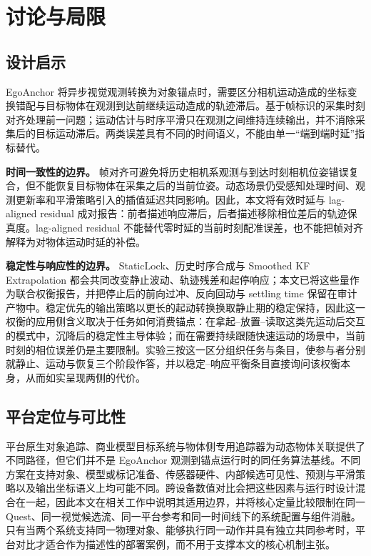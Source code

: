 \documentclass[review]{vgtc}
\begin{document}
\section{讨论与局限}\label{sec:discussion}


\subsection{设计启示}


EgoAnchor 将异步视觉观测转换为对象锚点时，需要区分相机运动造成的坐标变换错配与目标物体在观测到达前继续运动造成的轨迹滞后。基于帧标识的采集时刻对齐处理前一问题；运动估计与时序平滑只在观测之间维持连续输出，并不消除采集后的目标运动滞后。两类误差具有不同的时间语义，不能由单一“端到端时延”指标替代。

\textbf{时间一致性的边界。} 帧对齐可避免将历史相机系观测与到达时刻相机位姿错误复合，但不能恢复目标物体在采集之后的当前位姿。动态场景仍受感知处理时间、观测更新率和平滑策略引入的插值延迟共同影响。因此，本文将有效时延与 lag-aligned residual 成对报告：前者描述响应滞后，后者描述移除相位差后的轨迹保真度。lag-aligned residual 不能替代零时延的当前时刻配准误差，也不能把帧对齐解释为对物体运动时延的补偿。

\textbf{稳定性与响应性的边界。} StaticLock、历史时序合成与 Smoothed KF Extrapolation 都会共同改变静止波动、轨迹残差和起停响应；本文已将这些量作为联合权衡报告，并把停止后的前向过冲、反向回动与 settling time 保留在审计产物中。稳定优先的输出策略以更长的起动转换换取静止期的稳定保持，因此这一权衡的应用侧含义取决于任务如何消费锚点：在拿起--放置--读取这类先运动后交互的模式中，沉降后的稳定性主导体验；而在需要持续跟随快速运动的场景中，当前时刻的相位误差仍是主要限制。实验三按这一区分组织任务与条目，使参与者分别就静止、运动与恢复三个阶段作答，并以稳定--响应平衡条目直接询问该权衡本身，从而如实呈现两侧的代价。

\subsection{平台定位与可比性}

平台原生对象追踪、商业模型目标系统与物体侧专用追踪器为动态物体关联提供了不同路径，但它们并不是 EgoAnchor 观测到锚点运行时的同任务算法基线。不同方案在支持对象、模型或标记准备、传感器硬件、内部候选可见性、预测与平滑策略以及输出坐标语义上均可能不同。跨设备数值对比会把这些因素与运行时设计混合在一起，因此本文在相关工作中说明其适用边界，并将核心定量比较限制在同一 Quest、同一视觉候选流、同一平台参考和同一时间线下的系统配置与组件消融。只有当两个系统支持同一物理对象、能够执行同一动作并具有独立共同参考时，平台对比才适合作为描述性的部署案例，而不用于支撑本文的核心机制主张。
\end{document}
